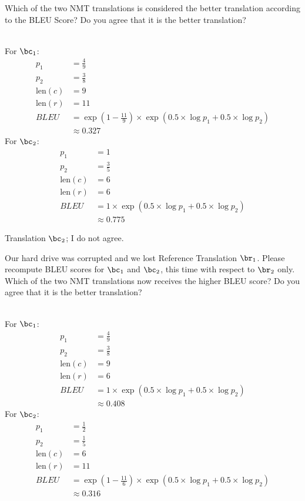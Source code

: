 \begin{parts}
\begin{subparts}
        Which of the two NMT translations is considered the better translation according to the BLEU Score? Do you agree that it is the better translation?
        
        \ifans{} \\ 
        For $\bc_1$:
        \begin{align*}
            p_1 &= \frac{4}{9} \\
            p_2 &= \frac{3}{8} \\
            \textrm{len} (c) &= 9 \\
            \textrm{len} (r) &= 11 \\
            BLEU &= \exp (1 - \frac{11}{9}) \times \exp (0.5 \times \log p_1 + 0.5 \times \log p_2) \\
            &\approx 0.327
        \end{align*}
        For $\bc_2$:
        \begin{align*}
            p_1 &= 1 \\
            p_2 &= \frac{3}{5} \\
            \textrm{len} (c) &= 6 \\
            \textrm{len} (r) &= 6 \\
            BLEU &= 1 \times \exp (0.5 \times \log p_1 + 0.5 \times \log p_2) \\
            &\approx 0.775
        \end{align*}

        Translation $\bc_2$; I do not agree.

        
        \subpart[5] Our hard drive was corrupted and we lost Reference Translation $\br_1$. Please recompute BLEU scores for $\bc_1$ and $\bc_2$, this time with respect to $\br_2$ only. Which of the two NMT translations now receives the higher BLEU score? Do you agree that it is the better translation?
        
        \ifans{} \\ 
        For $\bc_1$:
        \begin{align*}
            p_1 &= \frac{4}{9} \\
            p_2 &= \frac{3}{8} \\
            \textrm{len} (c) &= 9 \\
            \textrm{len} (r) &= 6 \\
            BLEU &= 1 \times \exp (0.5 \times \log p_1 + 0.5 \times \log p_2) \\
            &\approx 0.408
        \end{align*}
        For $\bc_2$:
        \begin{align*}
            p_1 &= \frac{1}{2} \\
            p_2 &= \frac{1}{5} \\
            \textrm{len} (c) &= 6 \\
            \textrm{len} (r) &= 11 \\
            BLEU &= \exp (1 - \frac{11}{6}) \times \exp (0.5 \times \log p_1 + 0.5 \times \log p_2) \\
            &\approx 0.316
        \end{align*}


\end{subparts}
\end{parts}

